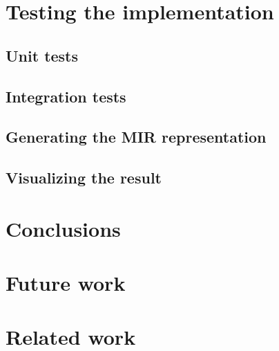 \documentclass[12pt, oneside]{book}
\begin{document}
\chapter{Testing the implementation}

\section{Unit tests}
\section{Integration tests}
\section{Generating the MIR representation}
\section{Visualizing the result}

\cite{dot2015}
\cite{hillah:hal-01176335}
\cite{jungel2000petri}

\chapter{Conclusions}

\chapter{Future work}

\chapter{Related work}


\clearpage


\end{document}
